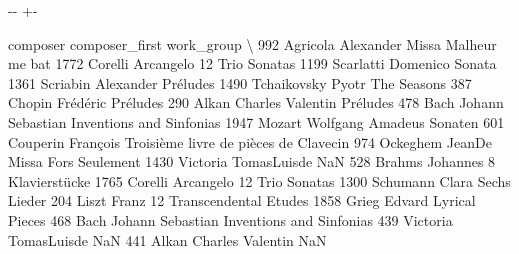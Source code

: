 \documentclass[letterpaper,10pt,english]{sphinxmanual}
\newlength\nbsphinxcodecellspacing
\begin{document}
{

\kern-\sphinxverbatimsmallskipamount\kern-\baselineskip
\kern+\FrameHeightAdjust\kern-\fboxrule
\vspace{\nbsphinxcodecellspacing}

\begin{sphinxVerbatim}[commandchars=\\\{\}]
\llap{\color{nbsphinxout}[26]:\,\hspace{\fboxrule}\hspace{\fboxsep}}         composer    composer\_first                             work\_group  \textbackslash{}
992      Agricola         Alexander                   Missa Malheur me bat
1772      Corelli         Arcangelo                        12 Trio Sonatas
1199    Scarlatti          Domenico                                 Sonata
1361     Scriabin         Alexander                               Préludes
1490  Tchaikovsky             Pyotr                            The Seasons
387        Chopin          Frédéric                               Préludes
290         Alkan  Charles Valentin                               Préludes
478          Bach  Johann Sebastian               Inventions and Sinfonias
1947       Mozart  Wolfgang Amadeus                                Sonaten
601      Couperin          François  Troisième livre de pièces de Clavecin
974      Ockeghem            JeanDe                   Missa Fors Seulement
1430     Victoria       TomasLuisde                                    NaN
528        Brahms          Johannes                        8 Klavierstücke
1765      Corelli         Arcangelo                        12 Trio Sonatas
1300     Schumann             Clara                           Sechs Lieder
204         Liszt             Franz               12 Transcendental Etudes
1858        Grieg            Edvard                         Lyrical Pieces
468          Bach  Johann Sebastian               Inventions and Sinfonias
439      Victoria       TomasLuisde                                    NaN
441         Alkan  Charles Valentin                                    NaN


\end{sphinxVerbatim}}
\end{document}
